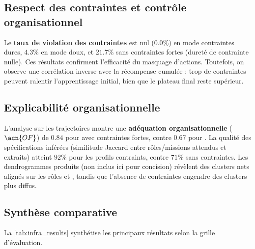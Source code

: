 \subsection*{Respect des contraintes et contrôle organisationnel}

Le \textbf{taux de violation des contraintes} est nul ($0.0\%$) en mode contraintes dures, $4.3\%$ en mode doux, et $21.7\%$ sans contraintes fortes (dureté de contrainte nulle).
Ces résultats confirment l'efficacité du masquage d'actions.
Toutefois, on observe une corrélation inverse avec la récompense cumulée : trop de contraintes peuvent ralentir l'apprentissage initial, bien que le plateau final reste supérieur.

\subsection*{Explicabilité organisationnelle}

L'analyse  sur les trajectoires montre une \textbf{adéquation organisationnelle} ($\acn{OF}$) de $0.84$ pour  avec contraintes fortes, contre $0.67$ pour .
La qualité des spécifications inférées (similitude Jaccard entre rôles/missions attendus et extraits) atteint $92\%$ pour les profils contraints, contre $71\%$ sans contraintes.
Les dendrogrammes produits (non inclus ici pour concision) révèlent des clusters nets alignés sur les rôles  et , tandis que l'absence de contraintes engendre des clusters plus diffus.

\subsection*{Synthèse comparative}

La \autoref{tab:infra_results} synthétise les principaux résultats selon la grille d'évaluation.

